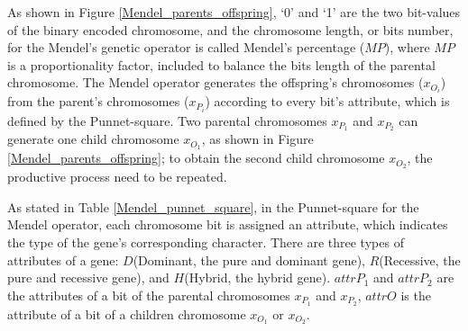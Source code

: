 As shown in Figure \ref{Mendel_parents_offspring}, `0' and `1' are
the two bit-values of the binary encoded chromosome, and the
chromosome length, or bits number, for the Mendel's genetic operator
is called Mendel's percentage ($MP$), where $MP$ is a
proportionality factor, included to balance the bits length of the
parental chromosome. %
The Mendel operator generates the offspring's chromosomes
($x_{{O}_i}$) from the parent's chromosomes ($x_{{P}_i}$) according
to every bit's attribute, which is defined by the
Punnet-square\cite{Mendel1865,O'Neil2009}. Two parental
chromosomes $x_{{P}_1}$ and $x_{{P}_2}$ can generate one child
chromosome $x_{{O}_1}$, as shown in Figure
\ref{Mendel_parents_offspring}; to obtain the second child
chromosome $x_{{O}_2}$, the productive process need to be repeated.


As stated in Table \ref{Mendel_punnet_square}, in the Punnet-square
for the Mendel operator, each chromosome bit is assigned an
attribute, which indicates the type of the gene's corresponding
character. There are three types of attributes of a gene: $D$(Dominant, the pure and dominant gene),
$R$(Recessive, the pure and recessive gene), and $H$(Hybrid, the
hybrid gene). $attrP_1$ and $attrP_2$ are the attributes of a
bit of the parental chromosomes $x_{{P}_1}$ and $x_{{P}_2}$, $attrO$
is the attribute of a bit of a children chromosome $x_{{O}_1}$ or
$x_{{O}_2}$. 

